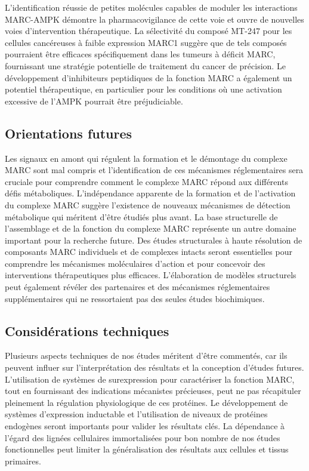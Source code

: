 \documentclass[11pt,a4paper]{article}
\begin{document}
L'identification réussie de petites molécules capables de moduler les interactions MARC-AMPK démontre la pharmacovigilance de cette voie et ouvre de nouvelles voies d'intervention thérapeutique. La sélectivité du composé MT-247 pour les cellules cancéreuses à faible expression MARC1 suggère que de tels composés pourraient être efficaces spécifiquement dans les tumeurs à déficit MARC, fournissant une stratégie potentielle de traitement du cancer de précision. Le développement d'inhibiteurs peptidiques de la fonction MARC a également un potentiel thérapeutique, en particulier pour les conditions où une activation excessive de l'AMPK pourrait être préjudiciable.

\subsection{Orientations futures}

Les signaux en amont qui régulent la formation et le démontage du complexe MARC sont mal compris et l'identification de ces mécanismes réglementaires sera cruciale pour comprendre comment le complexe MARC répond aux différents défis métaboliques. L'indépendance apparente de la formation et de l'activation du complexe MARC suggère l'existence de nouveaux mécanismes de détection métabolique qui méritent d'être étudiés plus avant. La base structurelle de l'assemblage et de la fonction du complexe MARC représente un autre domaine important pour la recherche future. Des études structurales à haute résolution de composants MARC individuels et de complexes intacts seront essentielles pour comprendre les mécanismes moléculaires d'action et pour concevoir des interventions thérapeutiques plus efficaces. L'élaboration de modèles structurels peut également révéler des partenaires et des mécanismes réglementaires supplémentaires qui ne ressortaient pas des seules études biochimiques.

\subsection{Considérations techniques}

Plusieurs aspects techniques de nos études méritent d'être commentés, car ils peuvent influer sur l'interprétation des résultats et la conception d'études futures. L'utilisation de systèmes de surexpression pour caractériser la fonction MARC, tout en fournissant des indications mécanistes précieuses, peut ne pas récapituler pleinement la régulation physiologique de ces protéines. Le développement de systèmes d'expression inductable et l'utilisation de niveaux de protéines endogènes seront importants pour valider les résultats clés. La dépendance à l'égard des lignées cellulaires immortalisées pour bon nombre de nos études fonctionnelles peut limiter la généralisation des résultats aux cellules et tissus primaires.
\end{document}

